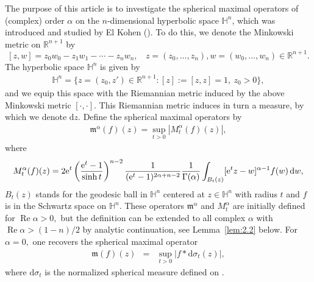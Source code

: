 \documentclass[11pt]{amsproc}
\newcommand{\e}{\mathrm{e}}
\newcommand{\fm}{\mathfrak{m}}
\newcommand{\0}{\mathbf{0}}
\renewcommand{\Re}{\mathop{\mathrm{Re}}}
\renewcommand{\H}{\mathbb{H}}
\renewcommand{\d}{\mathrm{d}}
\numberwithin{equation}{section}
\numberwithin{figure}{section}
\theoremstyle{definition}
\theoremstyle{remark}
\numberwithin{thm}{section}
\begin{document}
The purpose of this article is to investigate
the spherical maximal operators of (complex) order $\alpha$ on the $n$-dimensional  hyperbolic space $\H^n$, which was  introduced and studied by El Kohen (\cite{Ko}).  To do this,  we denote the Minkowski metric on ${\mathbb R^{n+1}}$   by
$$
[z,w]=z_0w_0 -z_1w_1-\cdots -z_nw_n,\ \ \  \  z =(z_0,\dots, z_n), w =(w_0,\dots,w_n)\in {\mathbb R^{n+1}}.
$$
The  hyperbolic space $\H^n$ is given by
\begin{eqnarray*}
\H^n=\{z=(z_0,z')\in {\mathbb R^{n+1}}: [z]:=[z, z]=1, \  z_0>0\},
\end{eqnarray*}
and we equip this space  with the  Riemannian metric induced by the above Minkowski metric  $[\cdot,\cdot]$.  This Riemannian metric induces in turn a measure, by which we denote $\d z$. Define the  spherical maximal operators by
\begin{eqnarray}\label{e1.7}
{\mathfrak m}^\alpha(f)(z)  =\sup_{t>0}|M^\alpha_t(f)(z)|,
\end{eqnarray}
where
\begin{eqnarray}\label{e1.8}
M^\alpha_t(f)(z) =2\e^t\left({\e^t-1\over \sinh t}\right)^{n-2}{1\over(\e^t-1)^{2\alpha+n-2}} {1\over \Gamma(\alpha)}\int_{B_t(z)}[\e^tz-w]^{\alpha-1}f(w)\,\d w,
\end{eqnarray}
$B_t(z)$ stands for the geodesic ball in $\H^n$ centered at $z\in\H^n$ with radius $t$ and $f$ is in the Schwartz space on $\H^n$.  These operators $\fm^\alpha$ and $M^\alpha_t$ are initially defined for $\Re\alpha >0,$   but the definition can be extended to all complex $\alpha$ with   $\Re\alpha> (1-n)/2$ by analytic continuation, see Lemma~\ref{lem:2.2} below. For $\alpha=0,$ one recovers the spherical maximal operator
\begin{eqnarray}\label{e1.9}
{\mathfrak m} (f)(z)
&=& \sup_{t>0} |f\ast \d\sigma_t(z)|,
\end{eqnarray}
where $\d\sigma_t$ is the normalized spherical measure defined on \cite[p. 277]{Io}.
\end{document}
